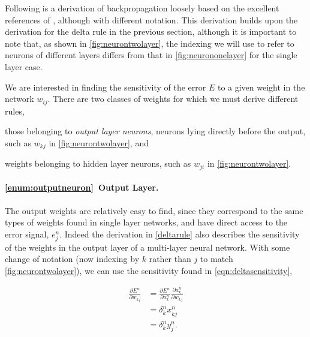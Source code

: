 \documentclass[thesis]{subfiles}
\begin{document}
Following is a derivation of backpropagation loosely based on the excellent references of \citet{haykin1994neural,Bishop1995}, although with different notation. This derivation builds upon the derivation for the delta rule in the previous section, although it is important to note that, as shown in \cref{fig:neurontwolayer}, the indexing we will use to refer to neurons of different layers differs from that in \cref{fig:neurononelayer} for the single layer case.

We are interested in finding the sensitivity of the error $E$ to a given weight in the network $w_{ij}$. There are two classes of weights for which we must derive different rules, 
\begin{enumerate*}[label= (\textbf{\roman*})]
  \item\label{enum:outputneuron} those belonging to \emph{output layer neurons}, \ie{}neurons lying directly before the output, such as $w_{kj}$ in \cref{fig:neurontwolayer}, and
  \item\label{enum:hiddenneuron} weights belonging to hidden layer neurons, such as $w_{ji}$ in \cref{fig:neurontwolayer}.
\end{enumerate*}

\paragraph{\ref{enum:outputneuron}~Output Layer.}
The output weights are relatively easy to find, since they correspond to the same types of weights found in single layer networks, and have direct access to the error signal, \ie$e^n_j$. Indeed the derivation in \cref{deltarule} also describes the sensitivity of the weights in the output layer of a multi-layer neural network. With some change of notation (now indexing by $k$ rather than $j$ to match \cref{fig:neurontwolayer}), we can use the sensitivity found in \cref{eqn:deltasensitivity},

\begin{equation}
\begin{aligned}
    \frac{\partial E^n}{\partial w_{kj}} &= \frac{\partial E^n}{\partial a^n_k} \frac{\partial a^n_k}{\partial w_{kj}}\\
    &= \delta^n_k x^n_{kj}\\
    &= \delta^n_k y^n_j.
\end{aligned}
\label{eqn:outputlayer}
\end{equation}
\end{document}
